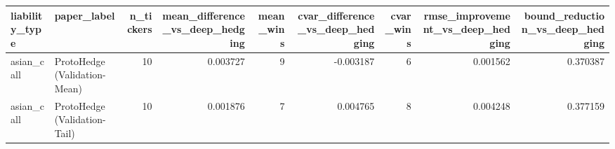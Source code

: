 \begin{tabular}{llrrrrrrr}
\toprule
liability\_type & paper\_label & n\_tickers & mean\_difference\_vs\_deep\_hedging & mean\_wins & cvar\_difference\_vs\_deep\_hedging & cvar\_wins & rmse\_improvement\_vs\_deep\_hedging & bound\_reduction\_vs\_deep\_hedging \\
\midrule
asian\_call & ProtoHedge (Validation-Mean) & 10 & 0.003727 & 9 & -0.003187 & 6 & 0.001562 & 0.370387 \\
asian\_call & ProtoHedge (Validation-Tail) & 10 & 0.001876 & 7 & 0.004765 & 8 & 0.004248 & 0.377159 \\
\bottomrule
\end{tabular}
